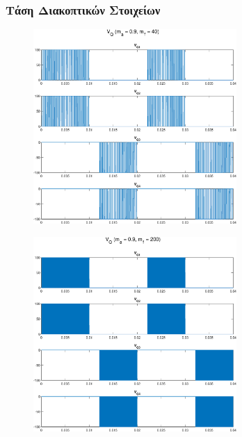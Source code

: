 \clearpage
\begin{figure}[h!]
	\subsubsection*{Τάση Διακοπτικών Στοιχείων}
		\begin{subfigure}{0.49\textwidth}
		\centering
		\includegraphics[width=0.85\textwidth]{Images/V_Q_40}
	\end{subfigure}
	\begin{subfigure}{0.49\textwidth}
		\centering
		\includegraphics[width=0.85\textwidth]{Images/V_Q_200}
	\end{subfigure}
\end{figure}
